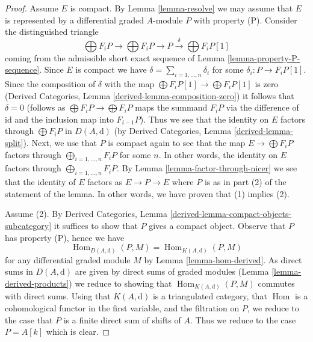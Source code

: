 \documentclass[10pt,a4paper]{amsart}
\theoremstyle{plain}
\theoremstyle{definition}
\theoremstyle{remark}
\numberwithin{equation}{subsection}
\def\Hom{\mathop{\mathrm{Hom}}\nolimits}
\begin{document}
\begin{proof}
Assume $E$ is compact. By Lemma \ref{lemma-resolve} we may assume that $E$
is represented by a differential graded $A$-module $P$ with property (P).
Consider the distinguished triangle
$$
\bigoplus F_iP \to \bigoplus F_iP \to P
\xrightarrow{\delta} \bigoplus F_iP[1]
$$
coming from the admissible short exact sequence of
Lemma \ref{lemma-property-P-sequence}. Since $E$ is compact we have
$\delta = \sum_{i = 1, \ldots, n} \delta_i$ for some
$\delta_i : P \to F_iP[1]$. Since the composition of $\delta$
with the map $\bigoplus F_iP[1] \to \bigoplus F_iP[1]$ is zero
(Derived Categories, Lemma \ref{derived-lemma-composition-zero})
it follows that $\delta = 0$ (follows as $\bigoplus F_iP \to \bigoplus F_iP$
maps the summand $F_iP$ via the difference of $\text{id}$ and the inclusion
map into $F_{i - 1}P$).
Thus we see that the identity on $E$ factors through
$\bigoplus F_iP$ in $D(A, \text{d})$ (by
Derived Categories, Lemma \ref{derived-lemma-split}).
Next, we use that $P$ is compact again to see that the map
$E \to \bigoplus F_iP$ factors through $\bigoplus_{i = 1, \ldots, n} F_iP$
for some $n$. In other words, the identity on $E$ factors through
$\bigoplus_{i = 1, \ldots, n} F_iP$. By
Lemma \ref{lemma-factor-through-nicer}
we see that the identity of $E$ factors as $E \to P \to E$
where $P$ is as in part (2) of the statement of the lemma.
In other words, we have proven that (1) implies (2).

\medskip\noindent
Assume (2). By
Derived Categories, Lemma \ref{derived-lemma-compact-objects-subcategory}
it suffices to show that $P$ gives a compact object. Observe that
$P$ has property (P), hence we have
$$
\Hom_{D(A, \text{d})}(P, M) = \Hom_{K(A, \text{d})}(P, M)
$$
for any differential graded module $M$ by Lemma \ref{lemma-hom-derived}.
As direct sums in $D(A, \text{d})$ are given by direct sums of
graded modules (Lemma \ref{lemma-derived-products}) we reduce
to showing that $\Hom_{K(A, \text{d})}(P, M)$ commutes with direct
sums. Using that $K(A, \text{d})$ is a triangulated category,
that $\Hom$ is a cohomological functor in the first
variable, and the filtration on $P$, we reduce to the case that
$P$ is a finite direct sum of shifts of $A$. Thus we reduce to
the case $P = A[k]$ which is clear.
\end{proof}
\end{document}
